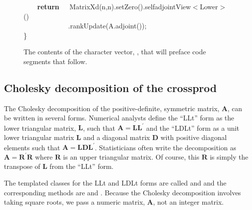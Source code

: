 \documentclass[shortnames,article]{jss}
\newcommand{\hlstd}[1]{\textcolor[rgb]{0,0,0}{#1}}
\newcommand{\hlopt}[1]{\textcolor[rgb]{0,0,0}{#1}}
\newcommand{\hlkwa}[1]{\textcolor[rgb]{0.61,0.13,0.93}{\bf{#1}}}
\newcommand{\hlkwd}[1]{\textcolor[rgb]{0,0,0}{#1}}
\begin{document}
\begin{figure}[htb]
  \hlstd{}\hlstd{\ \ \ \ }\hlstd{}\hlkwa{return}\hlstd{\ \ \ }\hlkwa{}\hlstd{}\hlkwd{MatrixXd}\hlstd{}\hlopt{(}\hlstd{n}\hlopt{,}\hlstd{n}\hlopt{).}\hlstd{}\hlkwd{setZero}\hlstd{}\hlopt{().}\hlstd{selfadjointView}\hlopt{$<$}\hlstd{Lower}\hlopt{$>$()}\hspace*{\fill}\\
  \hlstd{}\hlstd{\ \ \ \ \ \ \ \ \ \ \ \ \ }\hlstd{}\hlopt{.}\hlstd{}\hlkwd{rankUpdate}\hlstd{}\hlopt{(}\hlstd{A}\hlopt{.}\hlstd{}\hlkwd{adjoint}\hlstd{}\hlopt{());}\hspace*{\fill}\\
  \hlstd{}\hlopt{\}}\hlstd{}\hspace*{\fill}\\
  \mbox{}
  \normalfont
  \normalsize
  \caption{The contents of the character vector, , that will preface  code segments that follow.}
  \label{fig:incl}
\end{figure}

\subsection{Cholesky decomposition of the crossprod}
\label{sec:chol}

The Cholesky decomposition of the positive-definite, symmetric matrix,
$\bm A$, can be written in several forms.  Numerical analysts define
the ``LLt'' form as the lower triangular matrix, $\bm L$, such that
$\bm A=\bm L\bm L^\prime$ and the ``LDLt'' form as a unit lower
triangular matrix $\bm L$ and a diagonal matrix $\bm D$ with positive
diagonal elements such that $\bm A=\bm L\bm D\bm L^\prime$.
Statisticians often write the decomposition as $\bm A=\bm R^\prime\bm
R$ where $\bm R$ is an upper triangular matrix.  Of course, this $\bm
R$ is simply the transpose of $\bm L$ from the ``LLt'' form.

The templated  classes for the LLt and LDLt forms are
called  and  and the corresponding methods are
 and .
Because the Cholesky decomposition involves taking square roots, we
pass a numeric matrix, $\bm A$, not an integer matrix.
\end{document}
